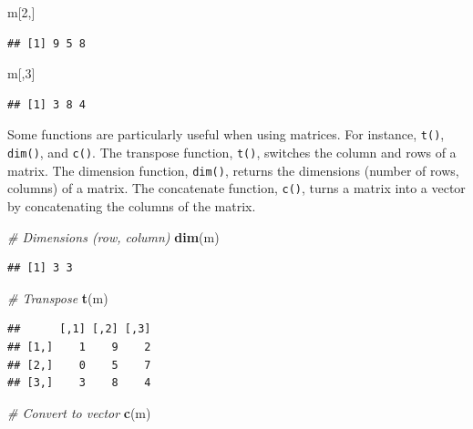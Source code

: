 \documentclass[
]{book}
\newenvironment{Shaded}{\begin{snugshade}}{\end{snugshade}}
\newcommand{\CommentTok}[1]{\textcolor[rgb]{0.56,0.35,0.01}{\textit{#1}}}
\newcommand{\DecValTok}[1]{\textcolor[rgb]{0.00,0.00,0.81}{#1}}
\newcommand{\KeywordTok}[1]{\textcolor[rgb]{0.13,0.29,0.53}{\textbf{#1}}}
\newcommand{\NormalTok}[1]{#1}
\begin{document}
\begin{Shaded}
\begin{Highlighting}[]
\NormalTok{m[}\DecValTok{2}\NormalTok{,]}
\end{Highlighting}
\end{Shaded}

\begin{verbatim}
## [1] 9 5 8
\end{verbatim}

\begin{Shaded}
\begin{Highlighting}[]
\NormalTok{m[,}\DecValTok{3}\NormalTok{]}
\end{Highlighting}
\end{Shaded}

\begin{verbatim}
## [1] 3 8 4
\end{verbatim}

Some functions are particularly useful when using matrices. For instance, \texttt{t()}, \texttt{dim()}, and \texttt{c()}. The transpose function, \texttt{t()}, switches the column and rows of a matrix. The dimension function, \texttt{dim()}, returns the dimensions (number of rows, columns) of a matrix. The concatenate function, \texttt{c()}, turns a matrix into a vector by concatenating the columns of the matrix.

\begin{Shaded}
\begin{Highlighting}[]
\CommentTok{# Dimensions (row, column)}
\KeywordTok{dim}\NormalTok{(m)}
\end{Highlighting}
\end{Shaded}

\begin{verbatim}
## [1] 3 3
\end{verbatim}

\begin{Shaded}
\begin{Highlighting}[]
\CommentTok{# Transpose}
\KeywordTok{t}\NormalTok{(m)}
\end{Highlighting}
\end{Shaded}

\begin{verbatim}
##      [,1] [,2] [,3]
## [1,]    1    9    2
## [2,]    0    5    7
## [3,]    3    8    4
\end{verbatim}

\begin{Shaded}
\begin{Highlighting}[]
\CommentTok{# Convert to vector }
\KeywordTok{c}\NormalTok{(m)}
\end{Highlighting}
\end{Shaded}
\end{document}
